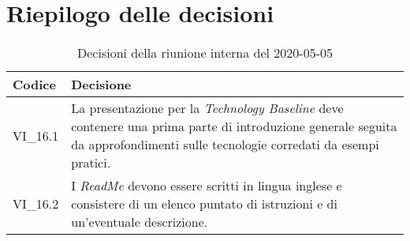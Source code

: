 \section{Riepilogo delle decisioni}
\begin{longtable}{ 
	 >{\centering}p{} >{}p{} }
	
	\caption{Decisioni della riunione interna del 2020-05-05}\\	
	
	\textbf{\color{white}Codice} & 
	\textbf{\color{white}Decisione} 
	\tabularnewline  
	\endhead
	
	VI\_16.1 & La presentazione per la \textit{Technology Baseline}\ped{\textit{G}} deve contenere una prima parte di introduzione generale seguita da approfondimenti sulle tecnologie corredati da esempi pratici. \\
	VI\_16.2 & I \textit{ReadMe} devono essere scritti in lingua inglese e consistere di un elenco puntato di istruzioni e di un'eventuale descrizione. \\	

\end{longtable}